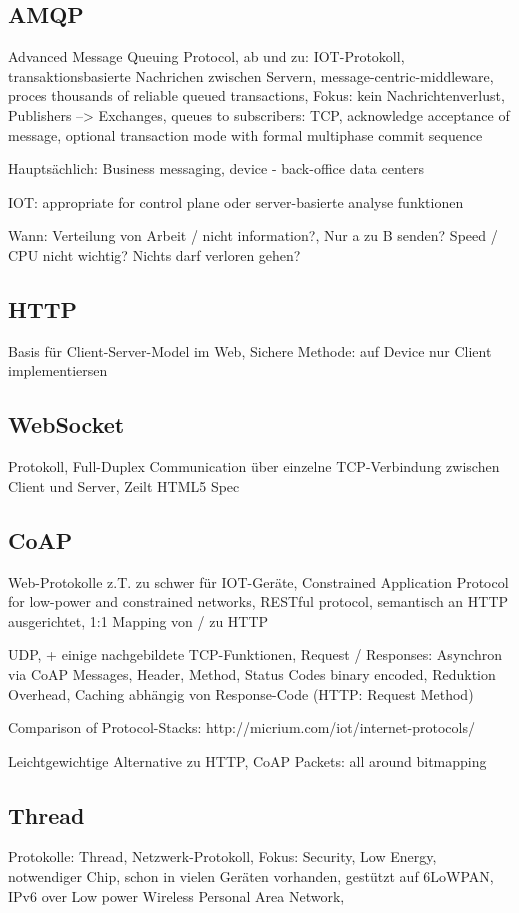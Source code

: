 \subsection{AMQP}
Advanced Message Queuing Protocol, ab und zu: IOT-Protokoll, transaktionsbasierte Nachrichen zwischen Servern, message-centric-middleware, proces thousands of reliable queued transactions, Fokus: kein Nachrichtenverlust, Publishers --> Exchanges, queues to subscribers: TCP, acknowledge acceptance of message, optional transaction mode with formal multiphase commit sequence

Hauptsächlich: Business messaging, device - back-office data centers

IOT: appropriate for control plane oder server-basierte analyse funktionen

Wann: Verteilung von Arbeit / nicht information?, Nur a zu B senden? Speed / CPU nicht wichtig? Nichts darf verloren gehen?
\subsection{HTTP}
Basis für Client-Server-Model im Web, Sichere Methode: auf Device nur Client implementiersen

\subsection{WebSocket}
Protokoll, Full-Duplex Communication über einzelne TCP-Verbindung zwischen Client und Server, Zeilt HTML5 Spec

\subsection{CoAP}
Web-Protokolle z.T. zu schwer für IOT-Geräte, Constrained Application Protocol for low-power and constrained networks, RESTful protocol, semantisch an HTTP ausgerichtet, 1:1 Mapping von / zu HTTP

UDP, + einige nachgebildete TCP-Funktionen, Request / Responses: Asynchron via CoAP Messages, Header, Method, Status Codes binary encoded, Reduktion Overhead, Caching abhängig von Response-Code (HTTP: Request Method)

Comparison of Protocol-Stacks: http://micrium.com/iot/internet-protocols/

Leichtgewichtige Alternative zu HTTP, CoAP Packets: all around bitmapping

\subsection{Thread}
Protokolle: Thread, Netzwerk-Protokoll, Fokus: Security, Low Energy, notwendiger Chip, schon in vielen Geräten vorhanden, gestützt auf 6LoWPAN, IPv6 over Low power Wireless Personal Area Network, 


